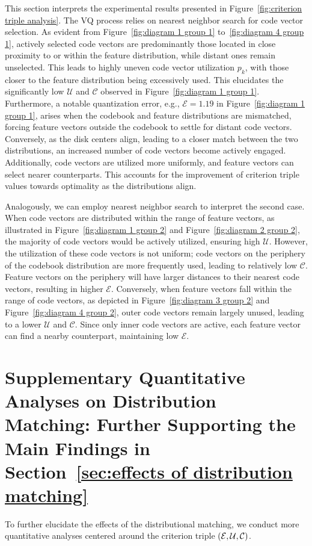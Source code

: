 This section interprets the experimental results presented in Figure~\ref{fig:criterion triple analysis}. The VQ process relies on nearest neighbor search for code vector selection. As evident from Figure~\ref{fig:diagram 1 group 1} to~\ref{fig:diagram 4 group 1}, actively selected code vectors are predominantly those located in close proximity to or within the feature distribution, while distant ones remain unselected. This leads to highly uneven code vector utilization $p_k$, with those closer to the feature distribution being excessively used. This elucidates the significantly low $\mathcal{U}$ and $\mathcal{C}$ observed in Figure~\ref{fig:diagram 1 group 1}. Furthermore, a notable quantization error, e.g., $\mathcal{E}=1.19$ in Figure~\ref{fig:diagram 1 group 1}, arises when the codebook and feature distributions are mismatched, forcing feature vectors outside the codebook to settle for distant code vectors. Conversely, as the disk centers align, leading to a closer match between the two distributions, an increased number of code vectors become actively engaged. Additionally, code vectors are utilized more uniformly, and feature vectors can select nearer counterparts. This accounts for the improvement of criterion triple values towards optimality as the distributions align.

Analogously, we can employ nearest neighbor search to interpret the second case. When code vectors are distributed within the range of feature vectors, as illustrated in Figure~\ref{fig:diagram 1 group 2} and Figure~\ref{fig:diagram 2 group 2}, the majority of code vectors would be actively utilized, ensuring high $\mathcal{U}$. However, the utilization of these code vectors is not uniform; code vectors on the periphery of the codebook distribution are more frequently used, leading to relatively low $\mathcal{C}$. Feature vectors on the periphery will have larger distances to their nearest code vectors, resulting in higher $\mathcal{E}$. Conversely, when feature vectors fall within the range of code vectors, as depicted in Figure~\ref{fig:diagram 3 group 2} and Figure~\ref{fig:diagram 4 group 2}, outer code vectors remain largely unused, leading to a lower $\mathcal{U}$ and $\mathcal{C}$. Since only inner code vectors are active, each feature vector can find a nearby counterpart, maintaining low $\mathcal{E}$.

\section{Supplementary Quantitative Analyses on Distribution Matching: Further Supporting the Main Findings in Section~\ref{sec:effects of distribution matching}}
\label{appendix:supplementary comprehensive quantitative analyses}
To further elucidate the effects of the distributional matching, we conduct more quantitative analyses centered around the criterion triple $(\mathcal{E}, \mathcal{U}, \mathcal{C})$.

